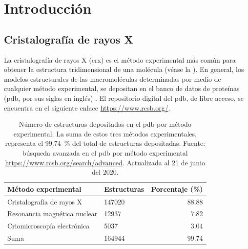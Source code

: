 \chapter{Introducción}
\section{Cristalografía de rayos X}
La cristalografía de rayos X (\acrshort{crx}) es el método experimental más común para obtener la estructura tridimensional de una molécula (véase la ). En general, los modelos estructurales de las macromoléculas determinadas por medio de cualquier método experimental, se depositan en el banco de datos de proteínas (\acrshort{pdb}, por sus siglas en inglés) . El repositorio digital del \acrshort{pdb}, de libre acceso, se encuentra en el siguiente enlace \url{https://www.rcsb.org/}. 

\begin{table}[h]
	\centering
	\begin{tabular}{@{}llr@{}}
		\toprule
		Método experimental & Estructuras  & Porcentaje (\si{\percent})       \\ 
		\midrule
		Cristalografía de rayos X & 147020 & 88.88	\\
		Resonancia magnética nuclear & 12937  & 7.82		\\
		Criomicroscopía electrónica & 5037   & 3.04		\\
		Suma   & 164944 & 99.74		\\ \bottomrule
	\end{tabular}%
	\caption[Número de estructuras por método experimental]{Número de estructuras depositadas en el \acrshort{pdb} por método experimental. La suma de estos tres métodos experimentales, representa el \SI{99.74}{\percent} del total de estructuras depositadas. Fuente: búsqueda avanzada en el \acrshort{pdb} por método experimental \url{https://www.rcsb.org/search/advanced}. Actualizada al 21 de junio del 2020.}
\end{table}

